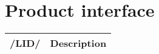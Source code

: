\chapter{Product interface}
\begin{tabular}{|l | l|}
   \hline
  /LID/ & Description \\
   \hline
\end{tabular}
